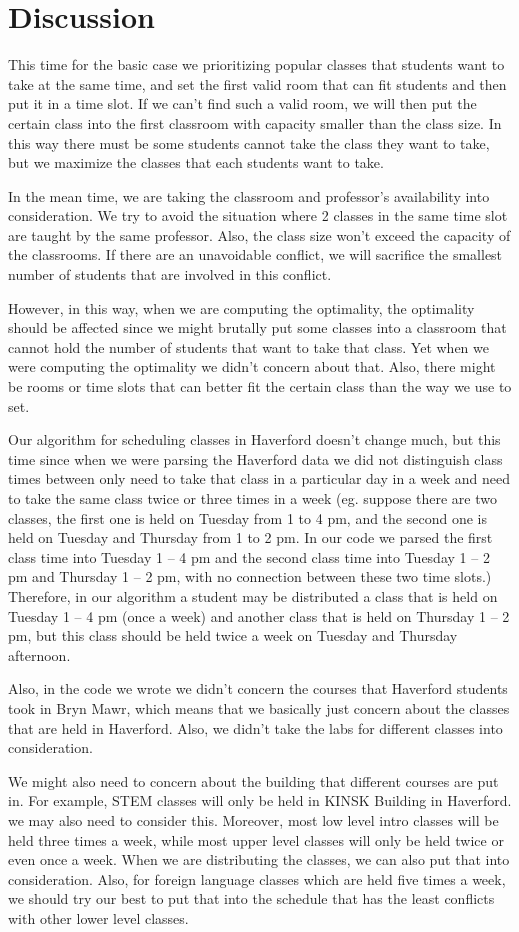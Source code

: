 \documentclass[11pt, oneside]{article}   	%
\begin{document}
\section{Discussion}
This time for the basic case we prioritizing popular classes that students want to take at the same time, and set the first valid room that can fit students and then put it in a time slot. If we can't find such a valid room, we will then put the certain class into the first classroom with capacity smaller than the class size. In this way there must be some students cannot take the class they want to take, but we maximize the classes that each students want to take.

In the mean time, we are taking the classroom and professor's availability into consideration. We try to avoid the situation where 2 classes in the same time slot are taught by the same professor. Also, the class size won't exceed the capacity of the classrooms. If there are an unavoidable conflict, we will sacrifice the smallest number of students that are involved in this conflict.

However, in this way, when we are computing the optimality, the optimality should be affected since we might brutally put some classes into a classroom that cannot hold the number of students that want to take that class. Yet when we were computing the optimality we didn't concern about that. Also, there might be rooms or time slots that can better fit the certain class than the way we use to set.

Our algorithm for scheduling classes in Haverford doesn't change much, but this time since when we were parsing the Haverford data we did not distinguish class times between only need to take that class in a particular day in a week and need to take the same class twice or three times in a week (eg. suppose there are two classes, the first one is held on Tuesday from 1 to 4 pm, and the second one is held on Tuesday and Thursday from 1 to 2 pm. In our code we parsed the first class time into Tuesday 1 -- 4 pm and the second class time into Tuesday 1 -- 2 pm and Thursday 1 -- 2 pm, with no connection between these two time slots.) Therefore, in our algorithm a student may be distributed a class that is held on Tuesday 1 -- 4 pm (once a week) and another class that is held on Thursday 1 -- 2 pm, but this class should be held twice a week on Tuesday and Thursday afternoon.

Also, in the code we wrote we didn't concern the courses that Haverford students took in Bryn Mawr, which means that we basically just concern about the classes that are held in Haverford. Also, we didn't take the labs for different classes into consideration.

We might also need to concern about the building that different courses are put in. For example, STEM classes will only be held in KINSK Building in Haverford. we may also need to consider this. Moreover, most low level intro classes will be held three times a week, while most upper level classes will only be held twice or even once a week. When we are distributing the classes, we can also put that into consideration. Also, for foreign language classes which are held five times a week, we should try our best to put that into the schedule that has the least conflicts with other lower level classes. 
\end{document}
